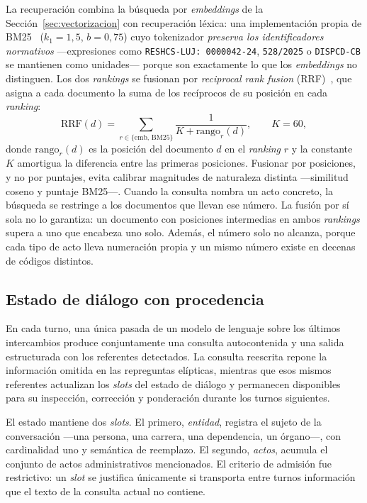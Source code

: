 \documentclass{llncs}
\begin{document}
La recuperación combina la búsqueda por \emph{embeddings} de la
Sección~\ref{sec:vectorizacion} con recuperación léxica: una
implementación propia de BM25~\cite{robertson2009bm25}
($k_1{=}1{,}5$, $b{=}0{,}75$) cuyo tokenizador \emph{preserva los identificadores
normativos} ---expresiones como \texttt{RESHCS-LUJ: 0000042-24}, \texttt{528/2025}
o \texttt{DISPCD-CB} se mantienen como unidades--- porque son exactamente lo que
los \emph{embeddings} no distinguen. Los dos \emph{rankings} se fusionan por
\emph{reciprocal rank fusion} (RRF)~\cite{cormack2009rrf}, que asigna a cada
documento la suma de los recíprocos de su posición en cada \emph{ranking}:
\begin{equation}
\mathrm{RRF}(d) = \sum_{r \in \{\mathrm{emb},\,\mathrm{BM25}\}} \frac{1}{K + \mathrm{rango}_r(d)},
\qquad K = 60,
\label{eq:rrf}
\end{equation}
donde $\mathrm{rango}_r(d)$ es la posición del documento $d$ en el
\emph{ranking} $r$ y la constante $K$ amortigua la diferencia entre las primeras
posiciones. Fusionar por posiciones, y no por puntajes, evita calibrar
magnitudes de naturaleza distinta ---similitud coseno y puntaje BM25---.
Cuando la consulta nombra un acto concreto, la búsqueda se restringe a los
documentos que llevan ese número. La fusión por sí sola no lo garantiza: un
documento con posiciones intermedias en ambos \emph{rankings} supera a uno que
encabeza uno solo. Además,
el número solo no alcanza, porque cada tipo de acto lleva numeración propia y
un mismo número existe en decenas de códigos distintos.

\subsection{Estado de diálogo con procedencia}
\label{sec:estado}

En cada turno, una única pasada de un modelo de lenguaje sobre los últimos
intercambios produce conjuntamente una consulta autocontenida y una salida
estructurada con los referentes detectados. La consulta reescrita repone la
información omitida en las repreguntas elípticas, mientras que esos mismos
referentes actualizan los \emph{slots} del estado de diálogo y permanecen
disponibles para su inspección, corrección y ponderación durante los
turnos siguientes.

El estado mantiene dos \emph{slots}. El primero, \emph{entidad}, registra el
sujeto de la conversación ---una persona, una carrera, una dependencia, un
órgano---, con cardinalidad uno y semántica de reemplazo. El segundo,
\emph{actos}, acumula el conjunto de actos administrativos mencionados. El
criterio de admisión fue restrictivo: un \emph{slot} se justifica únicamente
si transporta entre turnos información que el texto de la consulta actual no
contiene.
\end{document}
